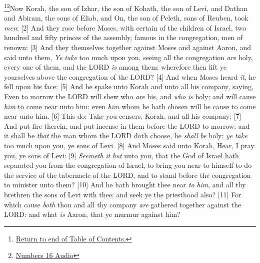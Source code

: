 \footnote{\textcolor[cmyk]{0.99998,1,0,0}{\hyperlink{TOC}{Return to end of Table of Contents.}}}\footnote{\href{https://audiobible.com/bible/numbers_16.html}{\textcolor[cmyk]{0.99998,1,0,0}{Numbers 16 Audio}}}\textcolor[cmyk]{0.99998,1,0,0}{Now Korah, the son of Izhar, the son of Kohath, the son of Levi, and Dathan and Abiram, the sons of Eliab, and On, the son of Peleth, sons of Reuben, took \emph{men}:}
[2] \textcolor[cmyk]{0.99998,1,0,0}{And they rose  before Moses, with certain of the children of Israel, two hundred and fifty princes of the assembly, famous in the congregation, men of renown:}
[3] \textcolor[cmyk]{0.99998,1,0,0}{And they  themselves together against Moses and against Aaron, and said unto them, \emph{Ye} \emph{take} too much upon you, seeing all the congregation \emph{are} holy, every one of them, and the LORD \emph{is} among them: wherefore then lift ye  yourselves above the congregation of the LORD?}
[4] \textcolor[cmyk]{0.99998,1,0,0}{And when Moses heard \emph{it}, he fell upon his face:}
[5] \textcolor[cmyk]{0.99998,1,0,0}{And he spake unto Korah and unto all his company, saying, Even to morrow the LORD will shew who \emph{are} his, and \emph{who} \emph{is} holy; and will cause \emph{him} to come near unto him: even \emph{him} whom he hath chosen will he cause to come near unto him.}
[6] \textcolor[cmyk]{0.99998,1,0,0}{This do; Take you censers, Korah, and all his company;}
[7] \textcolor[cmyk]{0.99998,1,0,0}{And put fire therein, and put incense in them before the LORD to morrow: and it shall be \emph{that} the man whom the LORD doth choose, he \emph{shall} \emph{be} holy: \emph{ye} \emph{take} too much upon you, ye sons of Levi.}
[8] \textcolor[cmyk]{0.99998,1,0,0}{And Moses said unto Korah, Hear, I pray you, ye sons of Levi:}
[9] \textcolor[cmyk]{0.99998,1,0,0}{\emph{Seemeth} \emph{it} \emph{but}  unto you, that the God of Israel hath separated you from the congregation of Israel, to bring you near to himself to do the service of the tabernacle of the LORD, and to stand before the congregation to minister unto them?}
[10] \textcolor[cmyk]{0.99998,1,0,0}{And he hath brought thee near \emph{to} \emph{him}, and all thy brethren the sons of Levi with thee: and seek ye the priesthood also?}
[11] \textcolor[cmyk]{0.99998,1,0,0}{For which cause \emph{both} thou and all thy company \emph{are} gathered together against the LORD: and what \emph{is} Aaron, that ye murmur against him?}\\
